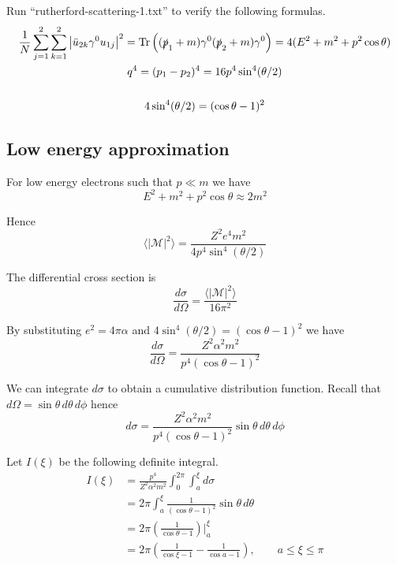 \documentclass[12pt]{article}
\begin{document}
\noindent
Run ``rutherford-scattering-1.txt'' to verify the following formulas.
\begin{gather*}
\frac{1}{N}\sum_{j=1}^2\sum_{k=1}^2\left|\bar{u}_{2k}\gamma^0 u_{1j}\right|^2
=\mathop{\rm Tr}\left((\slashed{p}_1+m)\gamma^0(\slashed{p}_2+m)\gamma^0\right)
=4(E^2+m^2+p^2\cos\theta)
\\
q^4=(p_1-p_2)^4=16p^4\sin^4(\theta/2)
\\
\\
4\sin^4(\theta/2)=(\cos\theta-1)^2
\end{gather*}

\subsection*{Low energy approximation}
For low energy electrons such that $p\ll m$ we have
\begin{equation*}
E^2+m^2+p^2\cos\theta\approx2m^2
\end{equation*}

\noindent
Hence
\begin{equation*}
\langle|\mathcal{M}|^2\rangle=\frac{Z^2e^4m^2}{4p^4\sin^4(\theta/2)}
\end{equation*}

\noindent
The differential cross section is
\begin{equation*}
\frac{d\sigma}{d\Omega}=\frac{\langle|\mathcal{M}|^2\rangle}{16\pi^2}
\end{equation*}

\noindent
By substituting $e^2=4\pi\alpha$ and $4\sin^4(\theta/2)=(\cos\theta-1)^2$ we have
\begin{equation*}
\frac{d\sigma}{d\Omega}
=\frac{Z^2\alpha^2m^2}{p^4(\cos\theta-1)^2}
\end{equation*}

\noindent
We can integrate $d\sigma$ to obtain a cumulative distribution function.
Recall that $d\Omega=\sin\theta\,d\theta\,d\phi$ hence
\begin{equation*}
d\sigma=\frac{Z^2\alpha^2m^2}{p^4(\cos\theta-1)^2}\sin\theta\,d\theta\,d\phi
\end{equation*}

\noindent
Let $I(\xi)$ be the following definite integral.
\begin{align*}
I(\xi)&=\frac{p^4}{Z^2\alpha^2m^2}\int_0^{2\pi}\int_a^\xi d\sigma
\\
&=2\pi\int_a^\xi\frac{1}{(\cos\theta-1)^2}\sin\theta\,d\theta
\\
&=2\pi\left(\frac{1}{\cos\theta-1}\right)\bigg|_a^\xi
\\
&=2\pi\left(\frac{1}{\cos\xi-1}-\frac{1}{\cos a-1}\right),\qquad a\le\xi\le\pi
\end{align*}
\end{document}
